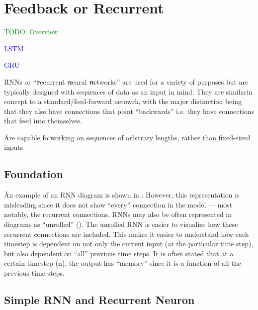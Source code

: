 \section{Feedback or Recurrent}

\textcolor{green}{TODO: Overview}


\textcolor{blue}{LSTM}

\textcolor{blue}{GRU}

\r{RNNs or ``\textit{\textbf{r}}ecurrent \textit{\textbf{n}}eural \textit{\textbf{n}}etworks'' are used for a variety of purposes but are typically designed with sequences of data as an input in mind. They are similarin concept to a standard/feed-forward netowrk, with the major distinction being that they also have connections that point ``backwards'' i.e. they have connections that feed into themselves.}

\r{Are capable fo working on sequences of arbitrary lengths, rather than fixed-sized inputs}

\subsection{Foundation}

\r{An example of an RNN diagram is shown in . However, this representation is misleading since it does not show ``every'' connection in the model --- most notably, the recurrent connections.  RNNs may also be often represented in diagrams as ``unrolled'' (). The unrolled RNN is easier to visualize how these recurrent connections are included.  This makes it easier to understand how each timestep is dependent on not only the current input (at the particular time step), but also dependent on ``all'' previous time steps. It is often stated that at a certain timestep (n), the output has ``memory'' since it is a function of all the previous time steps.}



\subsection{Simple RNN and Recurrent Neuron}



